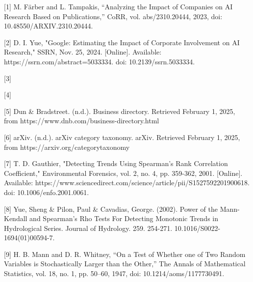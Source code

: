 \documentclass{article}
\begin{document}
[1] M. Färber and L. Tampakis, “Analyzing the Impact of Companies on AI Research Based on Publications,” CoRR, vol. abs/2310.20444, 2023, doi: 10.48550/ARXIV.2310.20444.

[2] D. I. Yue, "Google: Estimating the Impact of Corporate Involvement on AI Research," SSRN, Nov. 25, 2024. [Online]. Available: https://ssrn.com/abstract=5033334. doi: 10.2139/ssrn.5033334.

[3] 

[4]

[5] Dun \& Bradstreet. (n.d.). Business directory. Retrieved February 1, 2025, from https://www.dnb.com/business-directory.html

[6] arXiv. (n.d.). arXiv category taxonomy. arXiv. Retrieved February 1, 2025, from https://arxiv.org/category\textunderscore taxonomy

[7] T. D. Gauthier, "Detecting Trends Using Spearman's Rank Correlation Coefficient," Environmental Forensics, vol. 2, no. 4, pp. 359-362, 2001. [Online]. Available: https://www.sciencedirect.com/science/article/pii/S1527592201900618. doi: 10.1006/enfo.2001.0061.

[8] Yue, Sheng \& Pilon, Paul \& Cavadias, George. (2002). Power of the Mann-Kendall and Spearman's Rho Tests For Detecting Monotonic Trends in Hydrological Series. Journal of Hydrology. 259. 254-271. 10.1016/S0022-1694(01)00594-7. 

[9] H. B. Mann and D. R. Whitney, “On a Test of Whether one of Two Random Variables is Stochastically Larger than the Other,” The Annals of Mathematical Statistics, vol. 18, no. 1, pp. 50–60, 1947, doi: 10.1214/aoms/1177730491.
\end{document}
